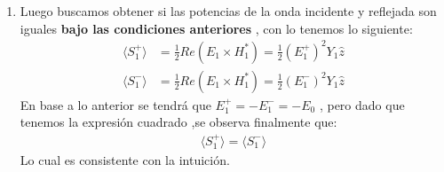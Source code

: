 \documentclass[
  11pt,
  letterpaper,
   addpoints,
   answers
  ]{exam}
\begin{document}
\begin{questions}
\begin{solution}
\begin{enumerate}
            \item Luego buscamos obtener si las potencias de la onda incidente y reflejada son iguales \textbf{bajo las condiciones anteriores} , con lo tenemos lo siguiente:
            \begin{align}
                \langle S_{1}^{+} \rangle &= \frac{1}{2} Re( E_{1} \times H_{1}^{*})= \frac{1}{2}(E_{1}^{+})^{2}Y_{1} \hat{z} \\
                 \langle S_{1}^{-} \rangle &= \frac{1}{2} Re( E_{1} \times H_{1}^{*})= \frac{1}{2}(E_{1}^{-})^{2}Y_{1} \hat{z}  
            \end{align}
            En base a lo anterior se tendrá que $E_{1}^{+} = -E_{1}^{-} = - E_{0} $ , pero dado que tenemos la expresión cuadrado ,se observa finalmente que:
            \begin{align}
                \langle S_{1}^{+} \rangle = \langle S_{1}^{-} \rangle
            \end{align}
            Lo cual es consistente con la intuición.
        \end{enumerate}
    \end{solution}
     
    
\end{questions}
\newpage
\end{document}
